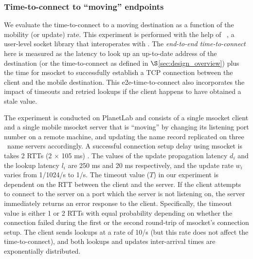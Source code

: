 \subsubsection{Time-to-connect to ``moving'' endpoints}
\label{sec:ttc_exp}



We evaluate the time-to-connect to a moving destination as a function of the mobility (or update) rate.  This experiment is performed with the help of \msocket\ \cite{msocketTR}, a user-level socket library that interoperates with \auspice.  The {\em end-to-end time-to-connect}  here is measured as the latency to look up an up-to-date address of the destination (or the time-to-connect as defined in $\S$\ref{sec:design_overview}) plus the time for msocket to successfully establish a TCP connection between the client and the mobile destination. This e2e-time-to-connect also incorporates the impact of timeouts and retried lookups if the client happens to have obtained a stale value. 

The experiment is conducted on PlanetLab and consists of a single msocket client and a single mobile msocket server that is ``moving'' by changing its listening port number on a remote machine, and updating the name record replicated on three \auspice\ name servers accordingly.  A successful connection setup delay using msocket is takes 2 RTTs (2 $\times$ 105 ms)  \cite{msocketTR}.  The values of the update propagation latency $d_i$ and the lookup latency $l_i$ are 250 ms and 20 ms respectively, and the update rate $w_i$ varies from 1/1024/s to 1/s. The timeout value ($T$) in our experiment is dependent on the RTT between the client and the server. If the client attempts to connect to the server on a port which the server is not listening on, the server immediately returns an error response to the client. Specifically, the timeout value is either 1 or 2 RTTs with equal probability depending on whether the connection failed during the first or the second round-trip of msocket's connection setup.
The client sends lookups at a rate of 10/s (but this rate does not affect the time-to-connect), and both lookups and updates inter-arrival times are exponentially distributed.


